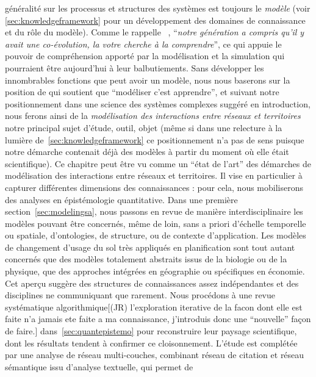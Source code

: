 généralité sur les processus et structures des systèmes est toujours le \emph{modèle} (voir \ref{sec:knowledgeframework} pour un développement des domaines de connaissance et du rôle du modèle). Comme le rappelle ~\cite{raimbault2017entretiens}, ``\textit{notre génération a compris qu'il y avait une co-évolution, la votre cherche à la comprendre}'', ce qui appuie le pouvoir de compréhension apporté par la modélisation et la simulation qui pourraient être aujourd'hui à leur balbutiements. Sans développer les innombrables fonctions que peut avoir un modèle, nous nous baserons sur la position de  qui soutient que ``modéliser c'est apprendre'', et suivant notre positionnement dans une science des systèmes complexes suggéré en introduction, nous ferons ainsi de la \emph{modélisation des interactions entre réseaux et territoires} notre principal sujet d'étude, outil, objet (même si dans une relecture à la lumière de~\ref{sec:knowledgeframework} ce positionnement n'a pas de sens puisque notre démarche contenait déjà des modèles à partir du moment où elle était scientifique). Ce chapitre peut être vu comme un ``état de l'art'' des démarches de modélisation des interactions entre réseaux et territoires. Il vise en particulier à capturer différentes dimensions des connaissances : pour cela, nous mobiliserons des analyses en épistémologie quantitative. Dans une première section~\ref{sec:modelingsa}, nous passons en revue de manière interdisciplinaire les modèles pouvant être concernés, même de loin, sans a priori d'échelle temporelle ou spatiale, d'ontologies, de structure, ou de contexte d'application. Les modèles de changement d'usage du sol très appliqués en planification sont tout autant concernés que des modèles totalement abstraits issus de la biologie ou de la physique, que des approches intégrées en géographie ou spécifiques en économie. Cet aperçu suggère des structures de connaissances assez indépendantes et des disciplines ne communiquant que rarement. Nous procédons à une revue systématique algorithmique[(JR) l'exploration iterative de la facon dont elle est faite n'a jamais ete faite a ma connaissance, j'introduis donc une ``nouvelle'' façon de faire.]  dans~\ref{sec:quantepistemo} pour reconstruire leur paysage scientifique, dont les résultats tendent à confirmer ce cloisonnement. L'étude est complétée par une analyse de réseau multi-couches, combinant réseau de citation et réseau sémantique issu d'analyse textuelle, qui permet de 